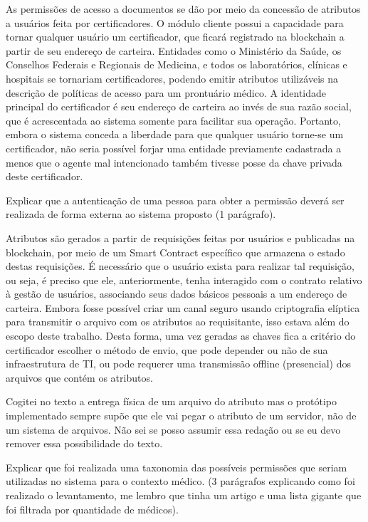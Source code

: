 \documentclass[a4paper,11pt]{article}
\begin{document}
As permissões de acesso a documentos se dão por meio da concessão de atributos a usuários feita por certificadores. O módulo cliente possui a capacidade para tornar qualquer usuário um certificador, que ficará registrado na blockchain a partir de seu endereço de carteira. Entidades como o Ministério da Saúde, os Conselhos Federais e Regionais de Medicina, e todos os laboratórios, clínicas e hospitais se tornariam certificadores, podendo emitir atributos utilizáveis na descrição de políticas de acesso para um prontuário médico. A identidade principal do certificador é seu endereço de carteira ao invés de sua razão social, que é acrescentada ao sistema somente para facilitar sua operação. Portanto, embora o sistema conceda a liberdade para que qualquer usuário torne-se um certificador, não seria possível forjar uma entidade previamente cadastrada a menos que o agente mal intencionado também tivesse posse da chave privada deste certificador. 

{\color{ForestGreen}Explicar que a autenticação de uma pessoa para obter a permissão deverá ser realizada de forma externa ao sistema proposto (1 parágrafo).} 

Atributos são gerados a partir de requisições feitas por usuários e publicadas na blockchain, por meio de um Smart Contract específico que armazena o estado destas requisições. É necessário que o usuário exista para realizar tal requisição, ou seja, é preciso que ele, anteriormente, tenha interagido com o contrato relativo à gestão de usuários, associando seus dados básicos pessoais a um endereço de carteira. Embora fosse possível criar um canal seguro usando criptografia elíptica para transmitir o arquivo com os atributos ao requisitante, isso estava além do escopo deste trabalho. Desta forma, uma vez geradas as chaves fica a critério do certificador escolher o método de envio, que pode depender ou não de sua infraestrutura de TI, ou pode requerer uma transmissão offline (presencial) dos arquivos que contém os atributos.   

{\color{RoyalBlue} Cogitei no texto a entrega física de um arquivo do atributo mas o protótipo implementado sempre supõe que ele vai pegar o atributo de um servidor, não de um sistema de arquivos. Não sei se posso assumir essa redação ou se eu devo remover essa possibilidade do texto.}

{\color{ForestGreen}Explicar que foi realizada uma taxonomia das possíveis permissões que seriam utilizadas no sistema para o contexto médico. (3 parágrafos explicando como foi realizado o levantamento, me lembro que tinha um artigo e uma lista gigante que foi filtrada por quantidade de médicos).} 
\end{document}
